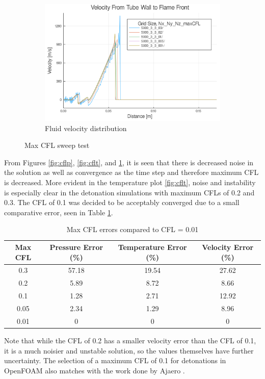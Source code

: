 \begin{figure}\ContinuedFloat
    \begin{subfigure}[]{\textwidth}
    \centering
    \includegraphics[width=\linewidth]{figs/cfl_test/u.png}
    \caption{Fluid velocity distribution}
    \label{fig:cflu}
    \end{subfigure}
    \caption{Max CFL sweep test}
    \label{fig:maxcfl}
\end{figure}



From Figures \ref{fig:cflp}, \ref{fig:cflt}, and \ref{fig:cflu}, it is seen that there is decreased noise in the solution as well as convergence as the time step and therefore maximum CFL is decreased. More evident in the temperature plot \ref{fig:cflt}, noise and instability is especially clear in the detonation simulations with maximum CFLs of 0.2 and 0.3. The CFL of 0.1 was decided to be acceptably converged due to a small comparative error, seen in Table \ref{tab:cflerror}. 
\begin{table}[]
\centering
\caption{Max CFL errors compared to CFL = 0.01}
\label{tab:cflerror}
\begin{tabular}{cccc}
Max CFL & Pressure Error (\%) & Temperature Error (\%) & Velocity Error (\%) \\ \hline
0.3 & 57.18 & 19.54 & 27.62 \\ 
0.2 & 5.89 & 8.72 & 8.66 \\
0.1 & 1.28 & 2.71 & 12.92 \\
0.05 & 2.34 & 1.29 & 8.96 \\
0.01 & 0 & 0 & 0 \\
\end{tabular}
\end{table}%
\noindent Note that while the CFL of 0.2 has a smaller velocity error than the CFL of 0.1, it is a much noisier and unstable solution, so the values themselves have further uncertainty. The selection of a maximum CFL of 0.1  for detonations in OpenFOAM also matches with the work done by Ajaero \cite{ajaero}. 

